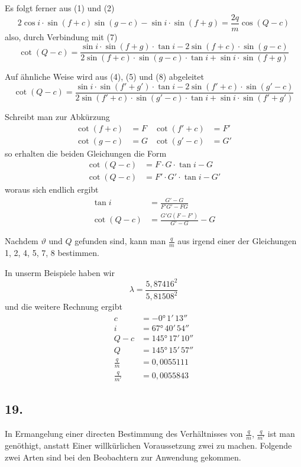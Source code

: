 \documentclass[12pt,a4paper]{article}
\begin{document}
Es folgt ferner aus (1) und (2)
\[ 2 \cos i \cdot \sin(f + c) \sin(g - c) - \sin i \cdot \sin(f + g) = \frac{2q}{m} \cos(Q - c) \]
also, durch Verbindung mit (7)
\[ \cot(Q - c) = \frac{\sin i \cdot \sin(f + g) \cdot \tan i - 2 \sin(f + c) \cdot \sin(g - c)}{2 \sin(f + c) \cdot \sin(g - c) \cdot \tan i + \sin i \cdot \sin(f + g)} \]

Auf ähnliche Weise wird aus (4), (5) und (8) abgeleitet
\[ \cot(Q - c) = \frac{\sin i \cdot \sin(f' + g') \cdot \tan i - 2 \sin(f' + c) \cdot \sin(g' - c)}{2 \sin(f' + c) \cdot \sin(g' - c) \cdot \tan i + \sin i \cdot \sin(f' + g')} \]

Schreibt man zur Abkürzung
\begin{align*}
\cot(f + c) &= F & \cot(f' + c) &= F' \\
\cot(g - c) &= G & \cot(g' - c) &= G'
\end{align*}
so erhalten die beiden Gleichungen die Form
\begin{align*}
\cot(Q - c) &= F \cdot G \cdot \tan i - G \\
\cot(Q - c) &= F' \cdot G' \cdot \tan i - G'
\end{align*}
woraus sich endlich ergibt
\begin{align*}
\tan i &= \frac{G' - G}{F'G' - FG} \\
\cot(Q - c) &= \frac{G'G(F - F')}{G' - G} - G
\end{align*}

Nachdem $\vartheta$ und $Q$ gefunden sind, kann man $\frac{q}{m}$ aus irgend einer der Gleichungen 1, 2, 4, 5, 7, 8 bestimmen.

In unserm Beispiele haben wir
\[ \lambda = \frac{5{,}87416^2}{5{,}81508^2} \]
und die weitere Rechnung ergibt
\begin{align*}
c &= -0°\,1'\,13'' \\
i &= 67°\,40'\,54'' \\
Q - c &= 145°\,17'\,10'' \\
Q &= 145°\,15'\,57'' \\
\frac{q}{m} &= 0{,}0055111 \\
\frac{q}{m'} &= 0{,}0055843
\end{align*}

\subsection*{19.}
In Ermangelung einer directen Bestimmung des Verhältnisses von $\frac{q}{m}$, $\frac{q}{m'}$ ist man genöthigt, anstatt Einer willkürlichen Voraussetzung zwei zu machen. Folgende zwei Arten sind bei den Beobachtern zur Anwendung gekommen.
\end{document}

